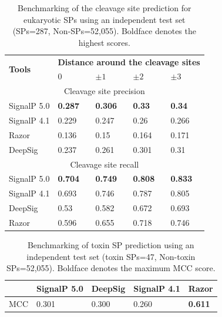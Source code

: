 \begin{table}[]
\centering
\caption[Benchmarking of the cleavage site prediction for eukaryotic SPs using an independent test set (SPs=287, Non-SPs=52,055).]{Benchmarking of the cleavage site prediction for eukaryotic SPs using an independent test set (SPs=287, Non-SPs=52,055). Boldface denotes the highest scores.
}
\begin{tabular}{|l|l|l|l|l|}
\hline
\multirow{2}{*}{\textbf{Tools}} & \multicolumn{4}{l|}{\textbf{Distance around the cleavage sites}} \\ \cline{2-5} 
            & 0              & $\pm1$              & $\pm2$              & $\pm3$              \\ \hline
\multicolumn{5}{|c|}{Cleavage site precision}                                   \\ \hline
SignalP 5.0 & \textbf{0.287} & \textbf{0.306} & \textbf{0.33}  & \textbf{0.34}  \\ \hline
SignalP 4.1 & 0.229          & 0.247          & 0.26           & 0.266          \\ \hline
Razor       & 0.136          & 0.15           & 0.164          & 0.171          \\ \hline
DeepSig     & 0.237          & 0.261          & 0.301          & 0.31           \\ \hline
\multicolumn{5}{|c|}{Cleavage site recall}                                      \\ \hline
SignalP 5.0 & \textbf{0.704} & \textbf{0.749} & \textbf{0.808} & \textbf{0.833} \\ \hline
SignalP 4.1 & 0.693          & 0.746          & 0.787          & 0.805          \\ \hline
DeepSig     & 0.53           & 0.582          & 0.672          & 0.693          \\ \hline
Razor       & 0.596          & 0.655          & 0.718          & 0.746          \\ \hline
\end{tabular}

\label{tab:razor_benchmark_independent_test_set_precision_recall}
\end{table}


\begin{table}[]
\centering
\caption[Benchmarking of toxin SP prediction using an independent test set (toxin SPs=47, Non-toxin SPs=52,055).]{Benchmarking of toxin SP prediction using an independent test set (toxin SPs=47, Non-toxin SPs=52,055). Boldface denotes the maximum MCC score.
}
\begin{tabular}{|l|l|l|l|l|}
\hline
\textbf{} & \textbf{SignalP 5.0} & \textbf{DeepSig} & \textbf{SignalP 4.1} & \textbf{Razor} \\ \hline
MCC       & 0.301                & 0.300            & 0.260                & \textbf{0.611}          \\ \hline
\end{tabular}

\label{tab:razor_benchmark_independent_test_set_toxin_mcc}
\end{table}

